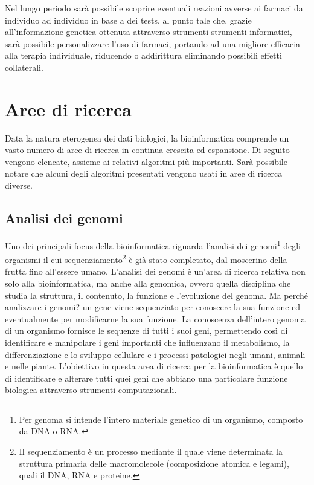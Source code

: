 \newline
Nel lungo periodo sarà possibile scoprire eventuali reazioni avverse ai farmaci da individuo ad individuo in base a dei tests, al punto tale che, grazie all'informazione genetica ottenuta attraverso strumenti strumenti informatici, sarà possibile personalizzare l'uso di farmaci, portando ad una migliore efficacia alla terapia individuale, riducendo o addirittura eliminando possibili effetti collaterali.

\section{Aree di ricerca}
Data la natura eterogenea dei dati biologici, la bioinformatica comprende un vasto numero di aree di ricerca in continua crescita ed espansione. Di seguito vengono elencate, assieme ai relativi algoritmi più importanti. 
\newline
Sarà possibile notare che alcuni degli algoritmi presentati vengono usati in aree di ricerca diverse.

\subsection{Analisi dei genomi}
Uno dei principali focus della bioinformatica riguarda l'analisi dei genomi\footnote{Per genoma si intende l'intero materiale genetico di un organismo, composto da DNA o RNA.} degli organismi il cui sequenziamento\footnote{Il sequenziamento è un processo mediante il quale viene determinata la struttura primaria delle macromolecole (composizione atomica e legami), quali il DNA, RNA e proteine.} è già stato completato, dal moscerino della frutta fino all'essere umano. L'analisi dei genomi è un'area di ricerca relativa non solo alla bioinformatica, ma anche alla genomica, ovvero quella disciplina che studia la struttura, il contenuto, la funzione e l'evoluzione del genoma.
Ma perché analizzare i genomi? un gene viene sequenziato per conoscere la sua funzione ed eventualmente per modificarne la sua funzione. La conoscenza dell'intero genoma di un organismo fornisce le sequenze di tutti i suoi geni, permettendo così di identificare e manipolare i geni importanti che influenzano il metabolismo, la differenziazione e lo sviluppo cellulare e i processi patologici negli umani, animali e nelle piante.
\newline
L'obiettivo in questa area di ricerca per la bioinformatica è quello di identificare e alterare tutti quei geni che abbiano una particolare funzione biologica attraverso strumenti computazionali.

